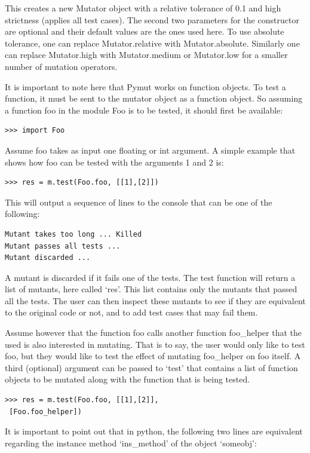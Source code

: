 \documentclass{acm_proc_article-sp}
\begin{document}
This creates a new Mutator object with a relative tolerance of 0.1 and high strictness (applies all test cases). The second two parameters for the constructor are optional and their default values are the ones used here. To use absolute tolerance, one can replace Mutator.relative with Mutator.absolute. Similarly one can replace Mutator.high with Mutator.medium or Mutator.low for a smaller number of mutation operators.

It is important to note here that Pymut works on function objects. To test a function, it must be sent to the mutator object as a function object. So assuming a function foo in the module Foo is to be tested, it should first be available:
\begin{lstlisting}
>>> import Foo
\end{lstlisting}

Assume foo takes as input one floating or int argument. A simple example that shows how foo can be tested with the arguments 1 and 2 is:
\begin{lstlisting}
>>> res = m.test(Foo.foo, [[1],[2]])
\end{lstlisting}

This will output a sequence of lines to the console that can be one of the following:

\begin{lstlisting}
Mutant takes too long ... Killed
Mutant passes all tests ...
Mutant discarded ...
\end{lstlisting}

A mutant is discarded if it fails one of the tests. The test function will return a list of mutants, here called `res'. This list contains only the mutants that passed all the tests. The user can then inspect these mutants to see if they are equivalent to the original code or not, and to add test cases that may fail them.

Assume however that the function foo calls another function foo\_helper that the used is also interested in mutating. That is to say, the user would only like to test foo, but they would like to test the effect of mutating foo\_helper on foo itself. A third (optional) argument can be passed to `test' that contains a list of function objects to be mutated along with the function that is being tested.

\begin{lstlisting}
>>> res = m.test(Foo.foo, [[1],[2]],
 [Foo.foo_helper])
\end{lstlisting}

It is important to point out that in python, the following two lines are equivalent regarding the instance method `ins\_method' of the object `someobj':
\end{document}
